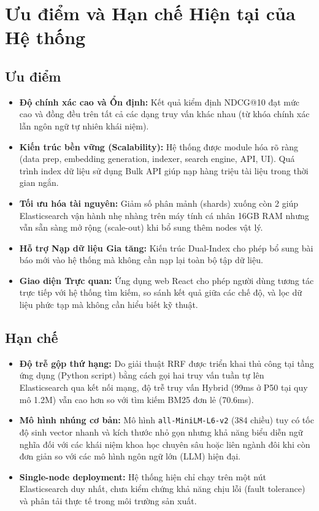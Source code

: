 \section{Ưu điểm và Hạn chế Hiện tại của Hệ thống}

\subsection{Ưu điểm}
\begin{itemize}
    \item \textbf{Độ chính xác cao và Ổn định:} Kết quả kiểm định NDCG@10 đạt mức cao và đồng đều trên tất cả các dạng truy vấn khác nhau (từ khóa chính xác lẫn ngôn ngữ tự nhiên khái niệm).
    \item \textbf{Kiến trúc bền vững (Scalability):} Hệ thống được module hóa rõ ràng (data prep, embedding generation, indexer, search engine, API, UI). Quá trình index dữ liệu sử dụng Bulk API giúp nạp hàng triệu tài liệu trong thời gian ngắn.
    \item \textbf{Tối ưu hóa tài nguyên:} Giảm số phân mảnh (shards) xuống còn 2 giúp Elasticsearch vận hành nhẹ nhàng trên máy tính cá nhân 16GB RAM nhưng vẫn sẵn sàng mở rộng (scale-out) khi bổ sung thêm nodes vật lý.
    \item \textbf{Hỗ trợ Nạp dữ liệu Gia tăng:} Kiến trúc Dual-Index cho phép bổ sung bài báo mới vào hệ thống mà không cần nạp lại toàn bộ tập dữ liệu.
    \item \textbf{Giao diện Trực quan:} Ứng dụng web React cho phép người dùng tương tác trực tiếp với hệ thống tìm kiếm, so sánh kết quả giữa các chế độ, và lọc dữ liệu phức tạp mà không cần hiểu biết kỹ thuật.
\end{itemize}

\subsection{Hạn chế}
\begin{itemize}
    \item \textbf{Độ trễ gộp thứ hạng:} Do giải thuật RRF được triển khai thủ công tại tầng ứng dụng (Python script) bằng cách gọi hai truy vấn tuần tự lên Elasticsearch qua kết nối mạng, độ trễ truy vấn Hybrid (99ms ở P50 tại quy mô 1.2M) vẫn cao hơn so với tìm kiếm BM25 đơn lẻ (70.6ms).
    \item \textbf{Mô hình nhúng cơ bản:} Mô hình \texttt{all-MiniLM-L6-v2} (384 chiều) tuy có tốc độ sinh vector nhanh và kích thước nhỏ gọn nhưng khả năng biểu diễn ngữ nghĩa đối với các khái niệm khoa học chuyên sâu hoặc liên ngành đôi khi còn đơn giản so với các mô hình ngôn ngữ lớn (LLM) hiện đại.
    \item \textbf{Single-node deployment:} Hệ thống hiện chỉ chạy trên một nút Elasticsearch duy nhất, chưa kiểm chứng khả năng chịu lỗi (fault tolerance) và phân tải thực tế trong môi trường sản xuất.
\end{itemize}

